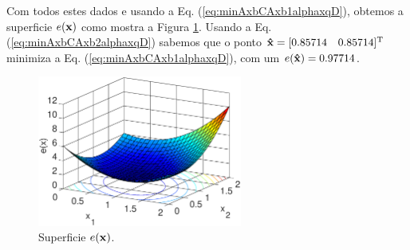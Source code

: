 \begin{SolutionT}
\label{ex:minAxbCAxbplusalphaxqD:sol1}
Com todos estes dados e usando a Eq. (\ref{eq:minAxbCAxb1alphaxqD}),
obtemos a superficie $e(\VECTOR{x})$ como mostra a Figura \ref{fig:ex:minAxbCAxb1alphaxqD:a}.
Usando a Eq. (\ref{eq:minAxbCAxb2alphaxqD}) sabemos que o ponto $\VECTOR{\hat{x}}=[0.85714\quad 0.85714]^{\transpose}$
minimiza a Eq. (\ref{eq:minAxbCAxb1alphaxqD}), com um $e(\VECTOR{\hat{x}})=0.97714$.

\begin{figure}[h!]
         \centering
         \includegraphics[width=0.6\textwidth]{chapters/minimization-fx/mfiles/axxq1/surfcex.eps}
         \caption{Superficie $e(\VECTOR{x})$. }
         \label{fig:ex:minAxbCAxb1alphaxqD:a}
\end{figure}

\end{SolutionT}

